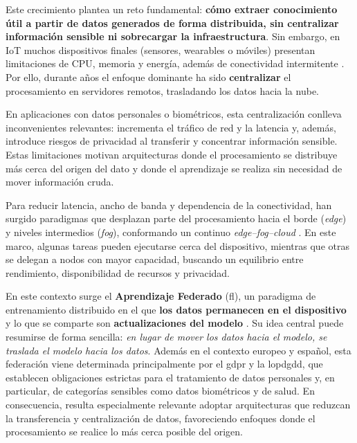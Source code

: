 \documentclass{report}
\begin{document}
Este crecimiento plantea un reto fundamental: \textbf{cómo extraer conocimiento útil a partir de datos generados de forma distribuida, sin centralizar información sensible ni sobrecargar la infraestructura}. Sin embargo, en IoT muchos dispositivos finales (sensores, wearables o móviles) presentan limitaciones de CPU, memoria y energía, además de conectividad intermitente \cite{shi2016edge}. Por ello, durante años el enfoque dominante ha sido \textbf{centralizar} el procesamiento en servidores remotos, trasladando los datos hacia la nube.

En aplicaciones con datos personales o biométricos, esta centralización conlleva inconvenientes relevantes: incrementa el tráfico de red y la latencia y, además, introduce riesgos de privacidad al transferir y concentrar información sensible. Estas limitaciones motivan arquitecturas donde el procesamiento se distribuye más cerca del origen del dato y donde el aprendizaje se realiza sin necesidad de mover información cruda.

Para reducir latencia, ancho de banda y dependencia de la conectividad, han surgido paradigmas que desplazan parte del procesamiento hacia el borde (\textit{edge}) y niveles intermedios (\textit{fog}), conformando un continuo \textit{edge--fog--cloud} \cite{satyanarayanan2017emergence,naha2018fog}. En este marco, algunas tareas pueden ejecutarse cerca del dispositivo, mientras que otras se delegan a nodos con mayor capacidad, buscando un equilibrio entre rendimiento, disponibilidad de recursos y privacidad.

En este contexto surge el \textbf{Aprendizaje Federado} (\gls{fl}), un paradigma de entrenamiento distribuido en el que \textbf{los datos permanecen en el dispositivo} y lo que se comparte son \textbf{actualizaciones del modelo} \cite{mcmahan2017communication,hard2018federated}. Su idea central puede resumirse de forma sencilla: \textit{en lugar de mover los datos hacia el modelo, se traslada el modelo hacia los datos}. Además en el contexto europeo y español, esta federación viene determinada principalmente por el \gls{gdpr}\cite{gdpr2016} y la \gls{lopdgdd}\cite{lopdgdd2018}, que establecen obligaciones estrictas para el tratamiento de datos personales y, en particular, de categorías sensibles como datos biométricos y de salud. En consecuencia, resulta especialmente relevante adoptar arquitecturas que reduzcan la transferencia y centralización de datos, favoreciendo enfoques donde el procesamiento se realice lo más cerca posible del origen.
\end{document}
